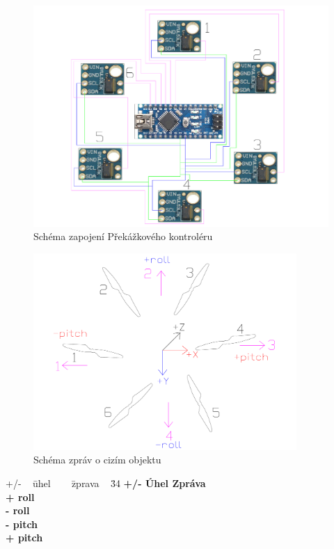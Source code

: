 \begin{figure}[h]
	\centering
	\includegraphics[width=12cm]{pictures/obstacle.pdf}
	\caption{Schéma zapojení Překážkového kontroléru}
\end{figure}

\begin{figure}[h]
	\centering
	\includegraphics[width=10cm]{pictures/obstacle_teo.pdf}
	\caption{Schéma zpráv o cizím objektu}
\end{figure}

\begin{tabbing}
	+/- ~ \= uhel ~~~ \= zprava ~
	\= 34 \kill
	\bfseries +/- \>
	\bfseries Úhel \>
	\bfseries Zpráva \\
	+\> roll   \\
	-\> roll   \\
	-\> pitch   \\
    +\> pitch   \\
\end{tabbing}


